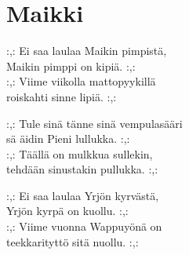 \section{Maikki}
:,: Ei saa laulaa Maikin pimpistä,\\
Maikin pimppi on kipiä. :,:\\
:,: Viime viikolla mattopyykillä\\
roiskahti sinne lipiä. :,:

:,: Tule sinä tänne sinä vempulasääri\\
sä äidin Pieni lullukka. :,:\\
:,: Täällä on mulkkua sullekin,\\
tehdään sinustakin pullukka. :,:

:,: Ei saa laulaa Yrjön kyrvästä,\\
Yrjön kyrpä on kuollu. :,:\\
:,: Viime vuonna Wappuyönä on\\
teekkarityttö sitä nuollu. :,: